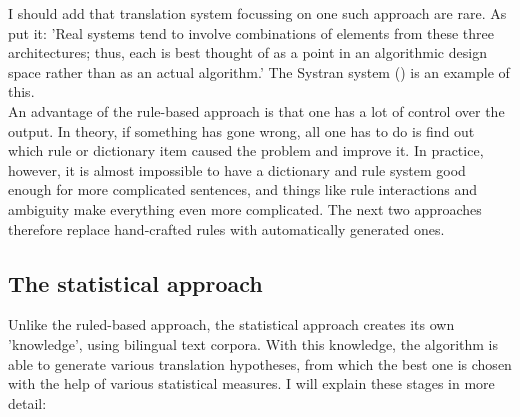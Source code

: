 \documentclass[12pt]{article}
\begin{document}
I should add that translation system focussing on one such approach are rare. As \citet{jm09} put it: 'Real systems tend to involve combinations of elements from these three architectures; thus, each is best thought of as a point in an algorithmic design space rather than as an actual algorithm.' The Systran system (\citealp{hs92,senellartea01}) is an example of this.\\\indent
An advantage of the rule-based approach is that one has a lot of control over the output. In theory, if something has gone wrong, all one has to do is find out which rule or dictionary item caused the problem and improve it. In practice, however, it is almost impossible to have a dictionary and rule system good enough for more complicated sentences, and things like rule interactions and ambiguity make everything even more complicated. The next two approaches therefore replace hand-crafted rules with automatically generated ones.

\subsection{The statistical approach}

Unlike the ruled-based approach, the statistical approach creates its own 'knowledge', using bilingual text corpora. With this knowledge, the algorithm is able to generate various translation hypotheses, from which the best one is chosen with the help of various statistical measures. I will explain these stages in more detail:
\end{document}
